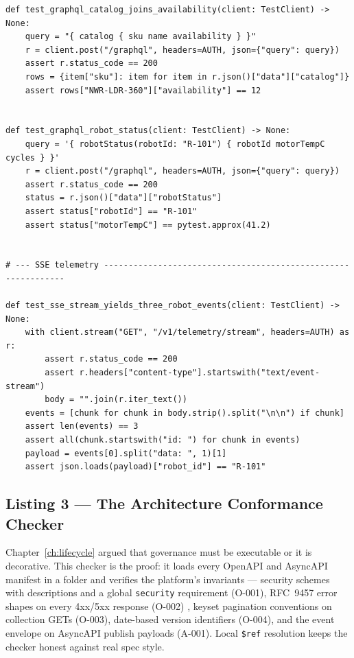\begin{verbatim}
def test_graphql_catalog_joins_availability(client: TestClient) -> None:
    query = "{ catalog { sku name availability } }"
    r = client.post("/graphql", headers=AUTH, json={"query": query})
    assert r.status_code == 200
    rows = {item["sku"]: item for item in r.json()["data"]["catalog"]}
    assert rows["NWR-LDR-360"]["availability"] == 12


def test_graphql_robot_status(client: TestClient) -> None:
    query = '{ robotStatus(robotId: "R-101") { robotId motorTempC cycles } }'
    r = client.post("/graphql", headers=AUTH, json={"query": query})
    assert r.status_code == 200
    status = r.json()["data"]["robotStatus"]
    assert status["robotId"] == "R-101"
    assert status["motorTempC"] == pytest.approx(41.2)


# --- SSE telemetry --------------------------------------------------------------

def test_sse_stream_yields_three_robot_events(client: TestClient) -> None:
    with client.stream("GET", "/v1/telemetry/stream", headers=AUTH) as r:
        assert r.status_code == 200
        assert r.headers["content-type"].startswith("text/event-stream")
        body = "".join(r.iter_text())
    events = [chunk for chunk in body.strip().split("\n\n") if chunk]
    assert len(events) == 3
    assert all(chunk.startswith("id: ") for chunk in events)
    payload = events[0].split("data: ", 1)[1]
    assert json.loads(payload)["robot_id"] == "R-101"
\end{verbatim}

\subsection{Listing 3 --- The Architecture Conformance Checker}
\label{sec:code-checker}

Chapter~\ref{ch:lifecycle} argued that governance must be executable or it
is decorative. This checker is the proof: it loads every OpenAPI
\cite{openapi31} and AsyncAPI \cite{asyncapi} manifest in a folder and
verifies the platform's invariants --- security schemes with descriptions
and a global \texttt{security} requirement (O-001), RFC~9457 error shapes on
every 4xx/5xx response (O-002) \cite{rfc9457}, keyset pagination conventions
on collection GETs (O-003), date-based version identifiers (O-004), and the
event envelope on AsyncAPI publish payloads (A-001). Local
\texttt{\$ref} resolution keeps the checker honest against real spec style.

